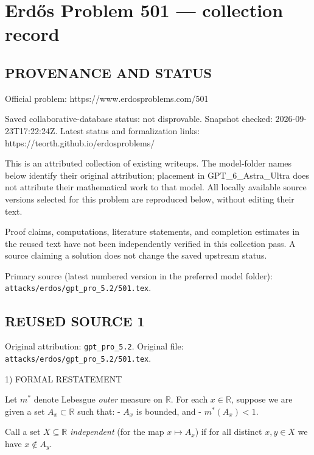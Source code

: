 \section*{Erd\H{o}s Problem 501 --- collection record}

\subsection*{PROVENANCE AND STATUS}
Official problem: https://www.erdosproblems.com/501

Saved collaborative-database status: not disprovable.
Snapshot checked: 2026-09-23T17:22:24Z.
Latest status and formalization links: https://teorth.github.io/erdosproblems/

This is an attributed collection of existing writeups. The model-folder names below identify their original attribution; placement in GPT\_6\_Astra\_Ultra does not attribute their mathematical work to that model. All locally available source versions selected for this problem are reproduced below, without editing their text.

Proof claims, computations, literature statements, and completion estimates in the reused text have not been independently verified in this collection pass. A source claiming a solution does not change the saved upstream status.

Primary source (latest numbered version in the preferred model folder): \texttt{attacks/erdos/gpt\_pro\_5.2/501.tex}.

\subsection*{REUSED SOURCE 1}
Original attribution: \texttt{gpt\_pro\_5.2}.
Original file: \texttt{attacks/erdos/gpt\_pro\_5.2/501.tex}.


1) FORMAL RESTATEMENT

Let $m^*$ denote Lebesgue \emph{outer} measure on $\mathbb R$.
For each $x\in\mathbb R$, suppose we are given a set $A_x\subset\mathbb R$ such that:
- $A_x$ is bounded, and
- $m^*(A_x)<1$.

Call a set $X\subseteq\mathbb R$ \emph{independent} (for the map $x\mapsto A_x$) if for all distinct $x,y\in X$ we have $x\notin A_y$.

